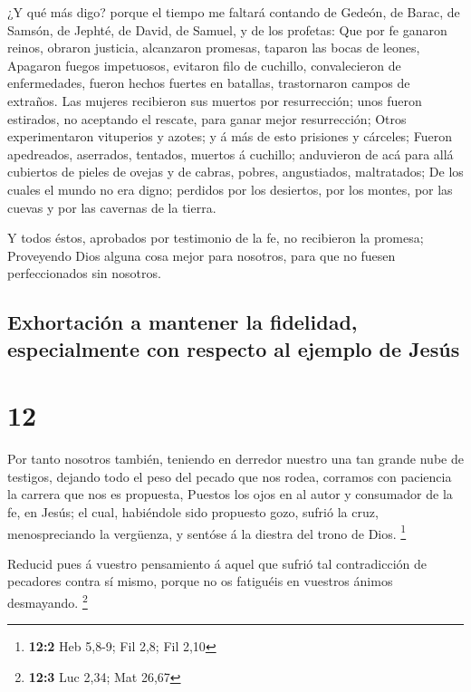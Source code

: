  ¿Y qué más digo? porque el tiempo me faltará contando de
Gedeón, de Barac, de Samsón, de Jephté, de David, de Samuel, y de los
profetas:  Que por fe ganaron reinos, obraron justicia,
alcanzaron promesas, taparon las bocas de leones,  Apagaron
fuegos impetuosos, evitaron filo de cuchillo, convalecieron de
enfermedades, fueron hechos fuertes en batallas, trastornaron campos de
extraños.  Las mujeres recibieron sus muertos por
resurrección; unos fueron estirados, no aceptando el rescate, para ganar
mejor resurrección;  Otros experimentaron vituperios y
azotes; y á más de esto prisiones y cárceles;  Fueron
apedreados, aserrados, tentados, muertos á cuchillo; anduvieron de acá
para allá cubiertos de pieles de ovejas y de cabras, pobres,
angustiados, maltratados;  De los cuales el mundo no era
digno; perdidos por los desiertos, por los montes, por las cuevas y por
las cavernas de la tierra.

 Y todos éstos, aprobados por testimonio de la fe, no
recibieron la promesa;  Proveyendo Dios alguna cosa mejor
para nosotros, para que no fuesen perfeccionados sin nosotros.

\hypertarget{exhortaciuxf3n-a-mantener-la-fidelidad-especialmente-con-respecto-al-ejemplo-de-jesuxfas}{%
\subsection{Exhortación a mantener la fidelidad, especialmente con
respecto al ejemplo de
Jesús}\label{exhortaciuxf3n-a-mantener-la-fidelidad-especialmente-con-respecto-al-ejemplo-de-jesuxfas}}

\hypertarget{section-11}{%
\section{12}\label{section-11}}

 Por tanto nosotros también, teniendo en derredor nuestro
una tan grande nube de testigos, dejando todo el peso del pecado que nos
rodea, corramos con paciencia la carrera que nos es propuesta,
 Puestos los ojos en al autor y consumador de la fe, en
Jesús; el cual, habiéndole sido propuesto gozo, sufrió la cruz,
menospreciando la vergüenza, y sentóse á la diestra del trono de Dios.
\footnote{\textbf{12:2} Heb 5,8-9; Fil 2,8; Fil 2,10}

 Reducid pues á vuestro pensamiento á aquel que sufrió tal
contradicción de pecadores contra sí mismo, porque no os fatiguéis en
vuestros ánimos desmayando. \footnote{\textbf{12:3} Luc 2,34; Mat 26,67}

